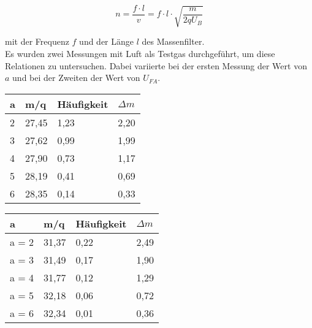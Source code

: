\begin{equation}
n = \frac{f\cdot l}{v}= f\cdot l \cdot \sqrt{\frac{m}{2qU_B}}
\end{equation}

mit der Frequenz $f$ und der Länge $l$ des Massenfilter.\\
Es wurden zwei Messungen mit Luft als Testgas durchgeführt, um diese Relationen zu untersuchen. Dabei variierte bei der ersten Messung der Wert von $a$ und bei der Zweiten der Wert von $U_{FA}$.


\begin{center}
\begin{tabular}{l|l|l|l}
a & m/q & Häufigkeit & $\Delta m$\\	
\hline		
2 & 27,45 & 1,23 & 2,20\\
3 & 27,62 & 0,99 & 1,99\\
4 & 27,90 & 0,73 & 1,17\\
5 & 28,19 & 0,41 & 0,69\\
6 & 28,35 & 0,14 & 0,33\\
\end{tabular}
\end{center}

\begin{center}
\begin{tabular}{l|l|l|l}
a & m/q & Häufigkeit & $\Delta m$\\
\hline
a = 2 &	31,37 &	0,22 & 2,49\\
a = 3 & 31,49 &	0,17 & 1,90\\
a = 4 & 31,77 &	0,12 & 1,29\\
a = 5 & 32,18 &	0,06 & 0,72\\
a = 6 & 32,34 &	0,01 & 0,36\\
\end{tabular}
\end{center}
